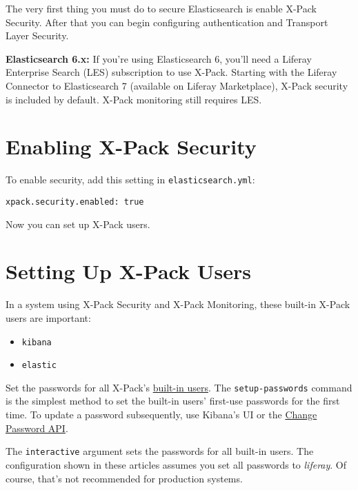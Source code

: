 The very first thing you must do to secure Elasticsearch is enable
X-Pack Security. After that you can begin configuring authentication and
Transport Layer Security.

\noindent\hrulefill

\textbf{Elasticsearch 6.x:} If you're using Elasticsearch 6, you'll need
a Liferay Enterprise Search (LES) subscription to use X-Pack. Starting
with the Liferay Connector to Elasticsearch 7 (available on Liferay
Marketplace), X-Pack security is included by default. X-Pack monitoring
still requires LES.

\noindent\hrulefill

\section{Enabling X-Pack Security}\label{enabling-x-pack-security}

To enable security, add this setting in \texttt{elasticsearch.yml}:

\begin{verbatim}
xpack.security.enabled: true
\end{verbatim}

Now you can set up X-Pack users.

\section{Setting Up X-Pack Users}\label{setting-up-x-pack-users}

In a system using X-Pack Security and X-Pack Monitoring, these built-in
X-Pack users are important:

\begin{itemize}
\tightlist
\item
  \texttt{kibana}
\item
  \texttt{elastic}
\end{itemize}

Set the passwords for all X-Pack's
\href{https://www.elastic.co/guide/en/elasticsearch/reference/7.x/built-in-users.html}{built-in
users}. The \texttt{setup-passwords} command is the simplest method to
set the built-in users' first-use passwords for the first time. To
update a password subsequently, use Kibana's UI or the
\href{https://www.elastic.co/guide/en/elasticsearch/reference/7.x/security-api-change-password.html}{Change
Password API}.

The \texttt{interactive} argument sets the passwords for all built-in
users. The configuration shown in these articles assumes you set all
passwords to \emph{liferay}. Of course, that's not recommended for
production systems.

